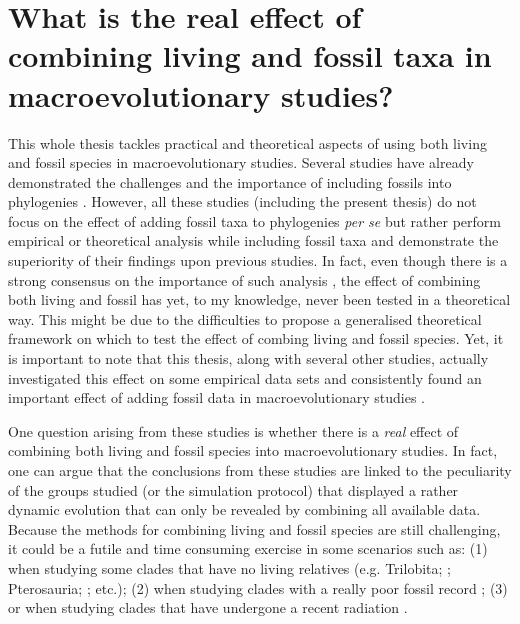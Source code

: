 \section{What is the real effect of combining living and fossil taxa in macroevolutionary studies?}
This whole thesis tackles practical and theoretical aspects of using both living and fossil species in macroevolutionary studies.
Several studies have already demonstrated the challenges and the importance of including fossils into phylogenies \citep[e.g.][]{ronquista2012,slaterphylogenetic2013,Wood01032013,beckancient2014,Dembo2015}.
However, all these studies (including the present thesis) do not focus on the effect of adding fossil taxa to phylogenies \textit{per se} but rather perform empirical or theoretical analysis while including fossil taxa and demonstrate the superiority of their findings upon previous studies.
In fact, even though there is a strong consensus on the importance of such analysis \citep{jacksonwhat2006,quentaldiversity2010,dietlconservation2011,slaterunifying2013,fritzdiversity2013,benton2015}, the effect of combining both living and fossil has yet, to my knowledge, never been tested in a theoretical way.
This might be due to the difficulties to propose a generalised theoretical framework on which to test the effect of combing living and fossil species.
Yet, it is important to note that this thesis, along with several other studies, actually investigated this effect on some empirical data sets and consistently found an important effect of adding fossil data in macroevolutionary studies \citep{Finarelli2006,Slateretal2012,slaterphylogenetic2013,SlaterPennel2014,pant2014complex,Mitchell2015}.

One question arising from these studies is whether there is a \textit{real} effect of combining both living and fossil species into macroevolutionary studies.
In fact, one can argue that the conclusions from these studies are linked to the peculiarity of the groups studied (or the simulation protocol) that displayed a rather dynamic evolution that can only be revealed by combining all available data.
Because the methods for combining living and fossil species are still challenging, it could be a futile and time consuming exercise in some scenarios such as: (1) when studying some clades that have no living relatives (e.g. Trilobita; \citealt{hopkinsdecoupling2013}; Pterosauria; \citealt{Butler2012}; etc.); (2) when studying clades with a really poor fossil record \citep[e.g. Aves where there are three orders of magnitude more known living than fossil taxa;][]{jetzthe2012,Mitchell2015}; (3) or when studying clades that have undergone a recent radiation \citep[e.g. Cichlidae][]{Genner01052007}.

